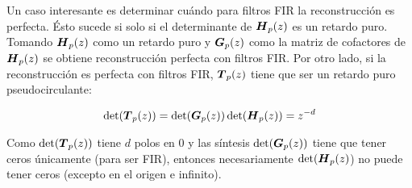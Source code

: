 		Un caso interesante es determinar cuándo para filtros FIR la reconstrucción es perfecta. Ésto sucede si solo si el determinante de $\boldsymbol{H}_p(z)$ es un retardo puro.\\
		\indent Tomando $\boldsymbol{H}_p(z)$ como un retardo puro y $\boldsymbol{G}_p(z)$ como la matriz de cofactores de $\boldsymbol{H}_p(z)$ se obtiene reconstrucción perfecta con filtros FIR. Por otro lado, si la reconstrucción es perfecta con filtros FIR, $\boldsymbol{T}_p(z)$ tiene que ser un retardo puro pseudocirculante: 
		
		\begin{equation*}
			\det(\boldsymbol{T}_p(z)) = \det(\boldsymbol{G}_p(z)) \det(\boldsymbol{H}_p(z)) = z^{-d}
		\end{equation*}
		
		Como $\det(\boldsymbol{T}_p(z))$ tiene $d$ polos en 0 y las síntesis $\det(\boldsymbol{G}_p(z))$ tiene que tener ceros únicamente (para ser FIR), entonces necesariamente $\det(\boldsymbol{H}_p(z)$) no puede tener ceros (excepto en el origen e infinito).\\






